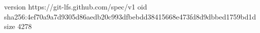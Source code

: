 version https://git-lfs.github.com/spec/v1
oid sha256:4ef70a9a7d9305d86aedb20c993dfbebdd38415668e473fd8d9dbbed1759bd1d
size 4278
